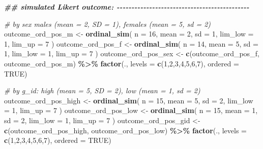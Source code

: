 \documentclass[
]{book}
\newenvironment{Shaded}{\begin{snugshade}}{\end{snugshade}}
\newcommand{\AttributeTok}[1]{\textcolor[rgb]{0.13,0.29,0.53}{#1}}
\newcommand{\CommentTok}[1]{\textcolor[rgb]{0.56,0.35,0.01}{\textit{#1}}}
\newcommand{\ConstantTok}[1]{\textcolor[rgb]{0.56,0.35,0.01}{#1}}
\newcommand{\DecValTok}[1]{\textcolor[rgb]{0.00,0.00,0.81}{#1}}
\newcommand{\DocumentationTok}[1]{\textcolor[rgb]{0.56,0.35,0.01}{\textbf{\textit{#1}}}}
\newcommand{\FunctionTok}[1]{\textcolor[rgb]{0.13,0.29,0.53}{\textbf{#1}}}
\newcommand{\NormalTok}[1]{#1}
\newcommand{\OtherTok}[1]{\textcolor[rgb]{0.56,0.35,0.01}{#1}}
\newcommand{\SpecialCharTok}[1]{\textcolor[rgb]{0.81,0.36,0.00}{\textbf{#1}}}
\begin{document}
\begin{Shaded}
\begin{Highlighting}[]
\DocumentationTok{\#\# simulated Likert outcome: {-}{-}{-}{-}{-}{-}{-}{-}{-}{-}{-}{-}{-}{-}{-}{-}{-}{-}{-}{-}{-}{-}{-}{-}{-}{-}{-}{-}{-}{-}{-}{-}{-}{-}{-}{-}{-}{-}{-}{-}{-}{-}{-}{-}{-}}

\CommentTok{\# by sex males (mean = 2, SD = 1), females (mean = 5, sd = 2)}
\NormalTok{outcome\_ord\_pos\_m }\OtherTok{\textless{}{-}} \FunctionTok{ordinal\_sim}\NormalTok{(}
  \AttributeTok{n =} \DecValTok{16}\NormalTok{, }\AttributeTok{mean =} \DecValTok{2}\NormalTok{, }\AttributeTok{sd =} \DecValTok{1}\NormalTok{, }\AttributeTok{lim\_low =} \DecValTok{1}\NormalTok{, }\AttributeTok{lim\_up =} \DecValTok{7}
\NormalTok{)}
\NormalTok{outcome\_ord\_pos\_f }\OtherTok{\textless{}{-}} \FunctionTok{ordinal\_sim}\NormalTok{(}
  \AttributeTok{n =} \DecValTok{14}\NormalTok{, }\AttributeTok{mean =} \DecValTok{5}\NormalTok{, }\AttributeTok{sd =} \DecValTok{1}\NormalTok{, }\AttributeTok{lim\_low =} \DecValTok{1}\NormalTok{, }\AttributeTok{lim\_up =} \DecValTok{7}
\NormalTok{)}
\NormalTok{outcome\_ord\_pos\_sex }\OtherTok{\textless{}{-}} \FunctionTok{c}\NormalTok{(outcome\_ord\_pos\_f, outcome\_ord\_pos\_m) }\SpecialCharTok{\%\textgreater{}\%}
  \FunctionTok{factor}\NormalTok{(., }\AttributeTok{levels =} \FunctionTok{c}\NormalTok{(}\DecValTok{1}\NormalTok{,}\DecValTok{2}\NormalTok{,}\DecValTok{3}\NormalTok{,}\DecValTok{4}\NormalTok{,}\DecValTok{5}\NormalTok{,}\DecValTok{6}\NormalTok{,}\DecValTok{7}\NormalTok{), }\AttributeTok{ordered =} \ConstantTok{TRUE}\NormalTok{)}


\CommentTok{\# by g\_id: high (mean = 5, SD = 2), low (mean = 1, sd = 2)}
\NormalTok{outcome\_ord\_pos\_high }\OtherTok{\textless{}{-}} \FunctionTok{ordinal\_sim}\NormalTok{(}
  \AttributeTok{n =} \DecValTok{15}\NormalTok{, }\AttributeTok{mean =} \DecValTok{5}\NormalTok{, }\AttributeTok{sd =} \DecValTok{2}\NormalTok{, }\AttributeTok{lim\_low =} \DecValTok{1}\NormalTok{, }\AttributeTok{lim\_up =} \DecValTok{7}
\NormalTok{)}
\NormalTok{outcome\_ord\_pos\_low }\OtherTok{\textless{}{-}} \FunctionTok{ordinal\_sim}\NormalTok{(}
  \AttributeTok{n =} \DecValTok{15}\NormalTok{, }\AttributeTok{mean =} \DecValTok{1}\NormalTok{, }\AttributeTok{sd =} \DecValTok{2}\NormalTok{, }\AttributeTok{lim\_low =} \DecValTok{1}\NormalTok{, }\AttributeTok{lim\_up =} \DecValTok{7}
\NormalTok{)}
\NormalTok{outcome\_ord\_pos\_gid }\OtherTok{\textless{}{-}} \FunctionTok{c}\NormalTok{(outcome\_ord\_pos\_high, outcome\_ord\_pos\_low) }\SpecialCharTok{\%\textgreater{}\%}
  \FunctionTok{factor}\NormalTok{(., }\AttributeTok{levels =} \FunctionTok{c}\NormalTok{(}\DecValTok{1}\NormalTok{,}\DecValTok{2}\NormalTok{,}\DecValTok{3}\NormalTok{,}\DecValTok{4}\NormalTok{,}\DecValTok{5}\NormalTok{,}\DecValTok{6}\NormalTok{,}\DecValTok{7}\NormalTok{), }\AttributeTok{ordered =} \ConstantTok{TRUE}\NormalTok{)}



\end{Highlighting}
\end{Shaded}
\end{document}
